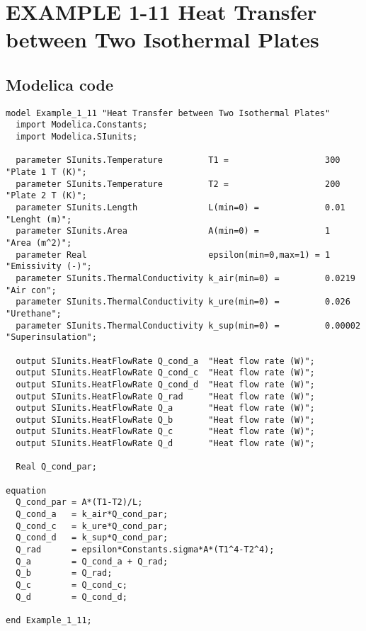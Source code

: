 \documentclass{modelica}
\begin{document}
\thispagestyle{empty}
\date{} %

\section*{EXAMPLE 1-11 Heat Transfer between Two Isothermal Plates}

\subsection*{Modelica code}


\begin{lstlisting}[mathescape=true] 
model Example_1_11 "Heat Transfer between Two Isothermal Plates"
  import Modelica.Constants;
  import Modelica.SIunits;

  parameter SIunits.Temperature         T1 =                   300     "Plate 1 T (K)";
  parameter SIunits.Temperature         T2 =                   200     "Plate 2 T (K)";
  parameter SIunits.Length              L(min=0) =             0.01    "Lenght (m)";
  parameter SIunits.Area                A(min=0) =             1       "Area (m^2)";
  parameter Real                        epsilon(min=0,max=1) = 1       "Emissivity (-)";
  parameter SIunits.ThermalConductivity k_air(min=0) =         0.0219  "Air con";
  parameter SIunits.ThermalConductivity k_ure(min=0) =         0.026   "Urethane";
  parameter SIunits.ThermalConductivity k_sup(min=0) =         0.00002 "Superinsulation";

  output SIunits.HeatFlowRate Q_cond_a  "Heat flow rate (W)";
  output SIunits.HeatFlowRate Q_cond_c  "Heat flow rate (W)";
  output SIunits.HeatFlowRate Q_cond_d  "Heat flow rate (W)";
  output SIunits.HeatFlowRate Q_rad     "Heat flow rate (W)";
  output SIunits.HeatFlowRate Q_a       "Heat flow rate (W)";
  output SIunits.HeatFlowRate Q_b       "Heat flow rate (W)";
  output SIunits.HeatFlowRate Q_c       "Heat flow rate (W)";
  output SIunits.HeatFlowRate Q_d       "Heat flow rate (W)";

  Real Q_cond_par;

equation 
  Q_cond_par = A*(T1-T2)/L;
  Q_cond_a   = k_air*Q_cond_par;
  Q_cond_c   = k_ure*Q_cond_par;
  Q_cond_d   = k_sup*Q_cond_par;
  Q_rad      = epsilon*Constants.sigma*A*(T1^4-T2^4);
  Q_a        = Q_cond_a + Q_rad;
  Q_b        = Q_rad;
  Q_c        = Q_cond_c;
  Q_d        = Q_cond_d;
  
end Example_1_11;  
\end{lstlisting}
\end{document}
